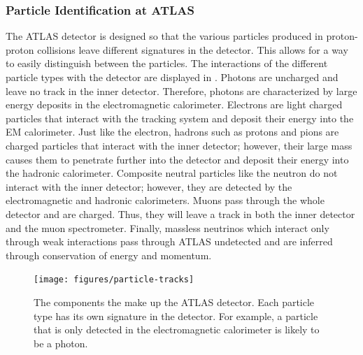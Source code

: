 \subsubsection{Particle Identification at ATLAS}
\label{subsubsec:particleid}
The ATLAS detector is designed so that the various particles produced in
proton-proton collisions leave different signatures in the detector. This
allows for a way to easily distinguish between the particles.
The interactions
of the different particle types with the detector are displayed in 
. Photons are uncharged and leave no track in
the inner detector. Therefore, photons are characterized by large energy 
deposits in the electromagnetic calorimeter. Electrons are light charged particles
that interact with the tracking system and deposit their energy into the 
EM calorimeter. Just like the electron, hadrons such as protons and pions 
are charged particles that interact with the inner detector; however, their
large mass causes them to penetrate further into the detector and deposit
their energy into the hadronic calorimeter. Composite neutral particles
like the neutron do not interact with the inner detector; however, they
are detected by the electromagnetic and hadronic calorimeters. Muons
pass through the whole detector and are charged. Thus, they will leave a
track in both the inner detector and the muon spectrometer. Finally,
massless neutrinos which interact only through weak interactions
pass through ATLAS undetected
and are inferred through conservation of energy and momentum.

\begin{figure}[!hbpt]
  \centering
  \texttt{[image: figures/particle-tracks]}
  \caption{The components the make up the ATLAS detector. Each particle type
  has its own signature in the detector. For example, a particle that is
  only detected in the electromagnetic calorimeter is likely to be a photon.
  }
  \label{fig:particleid}
\end{figure}





